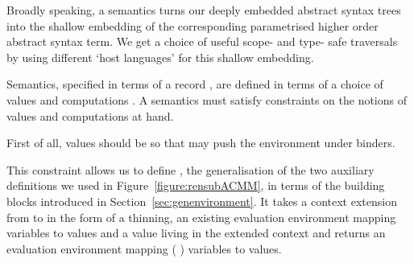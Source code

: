 \begin{agdasnippet}
\end{agdasnippet}

Broadly speaking, a semantics turns our deeply embedded abstract syntax
trees into the shallow embedding of the corresponding parametrised higher
order abstract syntax term. We get a choice of useful scope- and type- safe
traversals by using different `host languages' for this shallow embedding.

Semantics, specified in terms of a record \semrec{}, are defined in terms
of a choice of values  and computations . A semantics must
satisfy constraints on the notions of values  and computations 
at hand.



\begin{agdasnippet}
\label{section:lamsem}
\end{agdasnippet}
First of all, values  should be  so that \semfun{} may push
the environment under binders.

\begin{agdasnippet}
\addtolength{\leftskip}{\parindent}
\end{agdasnippet}
This constraint allows us to define , the generalisation of the two
auxiliary definitions we used in Figure~\ref{figure:rensubACMM}, in terms of
the building blocks introduced in Section~\ref{sec:genenvironment}.
It takes a context extension from  to  in the
form of a thinning, an existing evaluation environment mapping  variables
to  values and a value living in the extended context  and returns
an evaluation environment mapping ({  }) variables to 
values.

